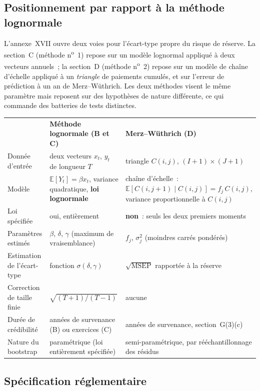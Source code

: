 \documentclass[a4paper,11pt]{article}
\begin{document}
\subsection{Positionnement par rapport à la méthode lognormale}

L'annexe~XVII ouvre deux voies pour l'écart-type propre du risque de réserve. La
section~C (méthode n\textsuperscript{o}~1) repose sur un modèle lognormal appliqué
à deux vecteurs annuels~; la section~D (méthode n\textsuperscript{o}~2) repose sur
un modèle de chaîne d'échelle appliqué à un \emph{triangle} de paiements cumulés,
et sur l'erreur de prédiction à un an de Merz--Wüthrich. Les deux méthodes visent
le même paramètre mais reposent sur des hypothèses de nature différente, ce qui
commande des batteries de tests distinctes.

\begin{center}
\small
{}
\begin{tabular}{@{}p{3.1cm}p{5.7cm}p{6.0cm}@{}}
\rowcolor{tableheader}
& \textcolor{financeblue}{\textbf{Méthode lognormale (B et C)}} &
\textcolor{financeblue}{\textbf{Merz--Wüthrich (D)}} \\
Donnée d'entrée & deux vecteurs $x_t$, $y_t$ de longueur $T$ &
triangle $C(i,j)$, $(I+1)\times(J+1)$ \\
Modèle & $\mathbb{E}[Y_t] = \beta x_t$, variance quadratique, \textbf{loi lognormale} &
chaîne d'échelle~: $\mathbb{E}[C(i,j+1)\mid C(i,j)] = f_j\,C(i,j)$, variance
proportionnelle à $C(i,j)$ \\
Loi spécifiée & oui, entièrement & \textbf{non}~: seuls les deux premiers moments \\
Paramètres estimés & $\beta$, $\delta$, $\gamma$ (maximum de vraisemblance) &
$f_j$, $\sigma_j^2$ (moindres carrés pondérés) \\
Estimation de l'écart-type & fonction $\sigma(\delta,\gamma)$ &
$\sqrt{\mathrm{MSEP}}$ rapportée à la réserve \\
Correction de taille finie & $\sqrt{(T+1)/(T-1)}$ & aucune \\
Durée de crédibilité & années de survenance (B) ou exercices (C) &
années de survenance, section~G(3)(c) \\
Nature du bootstrap & paramétrique (loi entièrement spécifiée) &
semi-paramétrique, par rééchantillonnage des résidus \\
\end{tabular}
\end{center}

\subsection{Spécification réglementaire}
\end{document}
